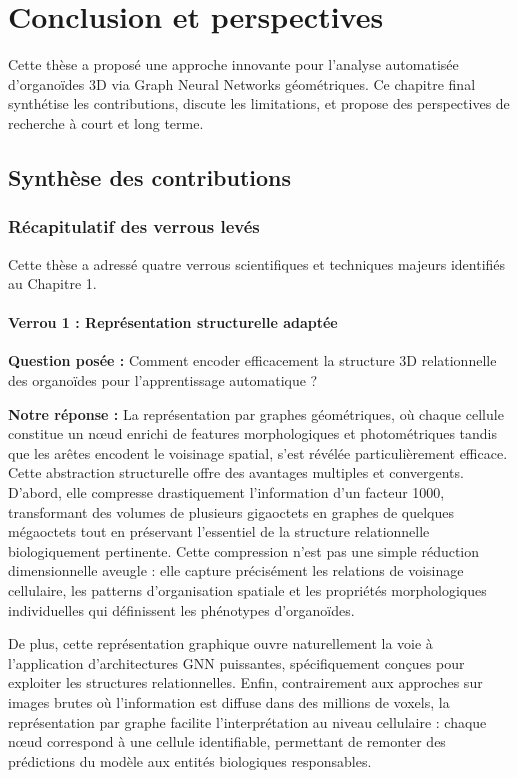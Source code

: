 
\chapter{Conclusion et perspectives}

Cette thèse a proposé une approche innovante pour l'analyse automatisée d'organoïdes 3D via Graph Neural Networks géométriques. Ce chapitre final synthétise les contributions, discute les limitations, et propose des perspectives de recherche à court et long terme.

\section{Synthèse des contributions}

\subsection{Récapitulatif des verrous levés}

Cette thèse a adressé quatre verrous scientifiques et techniques majeurs identifiés au Chapitre 1.

\subsubsection{Verrou 1 : Représentation structurelle adaptée}

\textbf{Question posée :} Comment encoder efficacement la structure 3D relationnelle des organoïdes pour l'apprentissage automatique ?

\textbf{Notre réponse :}
La représentation par graphes géométriques, où chaque cellule constitue un nœud enrichi de features morphologiques et photométriques tandis que les arêtes encodent le voisinage spatial, s'est révélée particulièrement efficace. Cette abstraction structurelle offre des avantages multiples et convergents. D'abord, elle compresse drastiquement l'information d'un facteur 1000, transformant des volumes de plusieurs gigaoctets en graphes de quelques mégaoctets tout en préservant l'essentiel de la structure relationnelle biologiquement pertinente. Cette compression n'est pas une simple réduction dimensionnelle aveugle : elle capture précisément les relations de voisinage cellulaire, les patterns d'organisation spatiale et les propriétés morphologiques individuelles qui définissent les phénotypes d'organoïdes. 

De plus, cette représentation graphique ouvre naturellement la voie à l'application d'architectures GNN puissantes, spécifiquement conçues pour exploiter les structures relationnelles. Enfin, contrairement aux approches sur images brutes où l'information est diffuse dans des millions de voxels, la représentation par graphe facilite l'interprétation au niveau cellulaire : chaque nœud correspond à une cellule identifiable, permettant de remonter des prédictions du modèle aux entités biologiques responsables.

